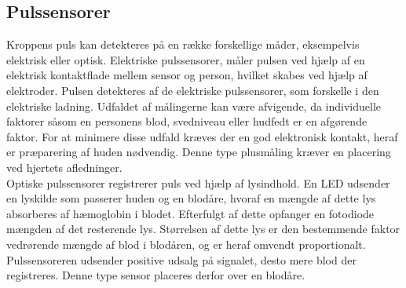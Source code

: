 \subsection{Pulssensorer}
Kroppens puls kan detekteres på en række forskellige måder, eksempelvis elektrisk eller optisk.
Elektriske pulssensorer, måler pulsen ved hjælp af en elektrisk kontaktflade mellem sensor og person, hvilket skabes ved hjælp af elektroder. Pulsen detekteres af de elektriske pulssensorer, som forskelle i den elektriske ladning. Udfaldet af målingerne kan være afvigende, da individuelle faktorer såsom en personens blod, svedniveau eller hudfedt er en afgørende faktor. For at minimere disse udfald kræves der en god elektronisk kontakt, heraf er præparering af huden nødvendig. Denne type plusmåling kræver en placering ved hjertets afledninger. \citep{PhuaLissorguesMercier2009}  \\
Optiske pulssensorer registrerer puls ved hjælp af lysindhold. En LED udsender en lyskilde som passerer huden og en blodåre, hvoraf en mængde af dette lys absorberes af hæmoglobin i blodet. Efterfulgt af dette opfanger en fotodiode mængden af det resterende lys. Størrelsen af dette lys er den bestemmende faktor vedrørende mængde af blod i blodåren, og er heraf omvendt proportionalt. Pulssensoreren udsender positive udsalg på signalet, desto mere blod der registreres. Denne type sensor placeres derfor over en blodåre.\citep{PhuaLissorguesMercier2009,SrinivasReddySrinivas2006} 

%
	


